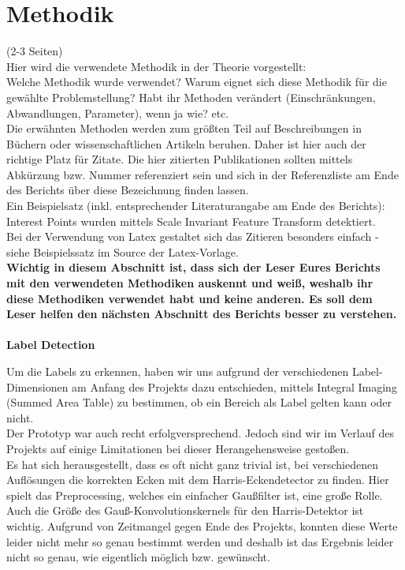 \documentclass[paper=A4, deutsch]{scrartcl}
\begin{document}

\section{Methodik}
(2-3 Seiten)\\
Hier wird die verwendete Methodik in der Theorie vorgestellt:\\
Welche Methodik wurde verwendet? Warum eignet sich diese Methodik für die gewählte Problemstellung? Habt ihr Methoden verändert (Einschränkungen, Abwandlungen, Parameter), wenn ja wie? etc.\\
Die erwähnten Methoden werden zum größten Teil auf Beschreibungen in Büchern oder wissenschaftlichen Artikeln beruhen. Daher ist hier auch der richtige Platz für Zitate. Die hier zitierten Publikationen sollten mittels Abkürzung bzw. Nummer referenziert sein und sich in der Referenzliste am Ende des Berichts über diese Bezeichnung finden lassen.\\
Ein Beispielsatz (inkl. entsprechender Literaturangabe am Ende des Berichts): Interest Points wurden mittels Scale Invariant Feature Transform \cite{lowe2004} detektiert.\\
Bei der Verwendung von Latex gestaltet sich das Zitieren besonders einfach - siehe Beispielssatz im Source der Latex-Vorlage.\\
\textbf{Wichtig in diesem Abschnitt ist, dass sich der Leser Eures Berichts mit den verwendeten Methodiken auskennt und weiß, weshalb ihr diese Methodiken verwendet habt und keine anderen. Es soll dem Leser helfen den nächsten Abschnitt des Berichts besser zu verstehen.}
\\
\\
\textbf{Label Detection}

Um die Labels zu erkennen, haben wir uns aufgrund der verschiedenen Label-Dimensionen am Anfang des Projekts dazu entschieden, mittels Integral Imaging (Summed Area Table) zu bestimmen, ob ein Bereich als Label gelten kann oder nicht.\\
Der Prototyp war auch recht erfolgversprechend. Jedoch sind wir im Verlauf des Projekts auf einige Limitationen bei dieser Herangehensweise gestoßen.\\
Es hat sich herausgestellt, dass es oft nicht ganz trivial ist, bei verschiedenen Auflösungen die korrekten Ecken mit dem Harris-Eckendetector zu finden. Hier spielt das Preprocessing, welches ein einfacher Gaußfilter ist, eine große Rolle. Auch die Größe des Gauß-Konvolutionskernels für den Harris-Detektor ist wichtig. Aufgrund von Zeitmangel gegen Ende des Projekts, konnten diese Werte leider nicht mehr so genau bestimmt werden und deshalb ist das Ergebnis leider nicht so genau, wie eigentlich möglich bzw. gewünscht.\\
\\
\end{document}
